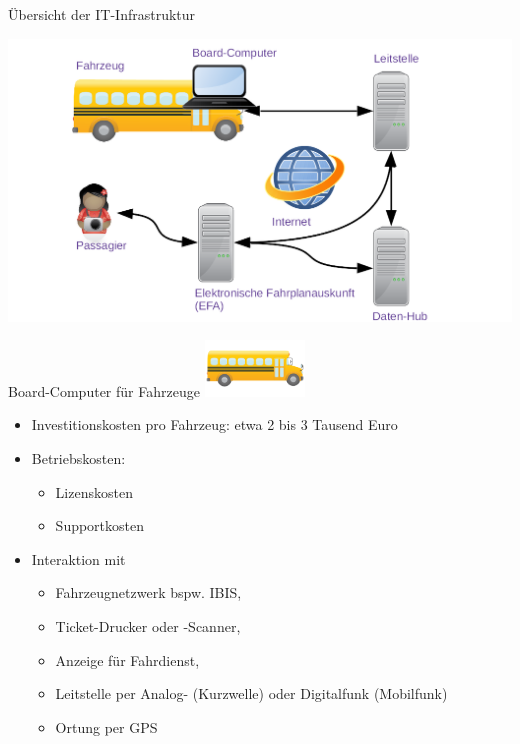 
\begin{frame}{Übersicht der IT-Infrastruktur}
  \begin{center}
    \includegraphics[width=1.1\textwidth]{otm-june-2-2021/public-transport-05-04-2021.png}
  \end{center}
\end{frame}

\begin{frame}{Board-Computer für Fahrzeuge}
  \includegraphics[width=0.2\textwidth]{otm-june-2-2021/bus.png}
  \begin{itemize}
  \item Investitionskosten pro Fahrzeug: etwa 2 bis 3 Tausend Euro
  \item Betriebskosten:
    \begin{itemize}
    \item Lizenskosten
    \item Supportkosten
    \end{itemize}
  \item Interaktion mit
    \begin{itemize}
    \item Fahrzeugnetzwerk bspw. IBIS,
    \item Ticket-Drucker oder -Scanner,
    \item Anzeige für Fahrdienst,
    \item Leitstelle per Analog- (Kurzwelle) oder Digitalfunk (Mobilfunk)
    \item Ortung per GPS
    \end{itemize}
  \end{itemize}
\end{frame}


